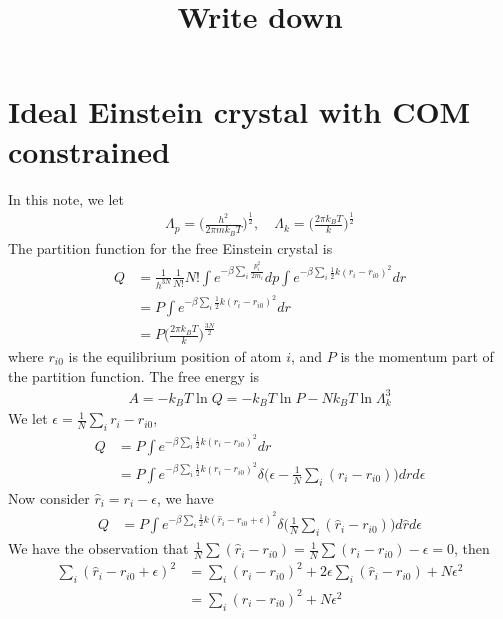 \documentclass[aps,pre,a4paper,showkeys,fleqn]{revtex4}
\begin{document}
\title{
Write down
}

\maketitle

\section{Ideal Einstein crystal with COM constrained}

In this note, we let
\begin{align*}
  \Lambda_p = \Big(\frac{h^2}{2\pi m k_BT}\Big)^{\frac12}, \quad \Lambda_k = \Big(\frac{2\pi k_BT}{k}\Big)^{\frac12}
\end{align*}
The partition function for the free Einstein crystal is
\begin{align*}
  Q & =
      \frac{1}{h^{3N}}
      \frac{1}{N!} N!
      \int e^{-\beta\sum_i\frac{p_i^2}{2m_i}} dp
      \int e^{-\beta\sum_i \frac 12k(r_i - r_{i0})^2} dr \\
    &= 
      P \int e^{-\beta\sum_i \frac 12k(r_i - r_{i0})^2} dr \\
    &=
      P \Big( \frac{2\pi k_BT}{k} \Big)^{\frac{3N}2}
\end{align*}
where $r_{i0}$ is the equilibrium position of atom $i$, and $P$ is the momentum part of the partition function.
The free energy is
\begin{align*}
  A = -k_BT\ln Q = -k_BT\ln P - Nk_BT\ln\Lambda_k^3
\end{align*}
We let $\epsilon = \frac1N \sum_i r_i - r_{i0}$,
\begin{align*}
  Q & =
      P \int e^{-\beta\sum_i \frac 12k(r_i - r_{i0})^2} dr \\
    & =
      P \int e^{-\beta\sum_i \frac 12k(r_i - r_{i0})^2} \delta\big( \epsilon - \frac1N \sum_i (r_i - r_{i0}) \big) dr d\epsilon 
\end{align*}
Now consider $\hat r_i = r_i - \epsilon$, we have
\begin{align}\label{eqn:1}
  Q & =
      P \int e^{-\beta\sum_i \frac 12k(\hat r_i - r_{i0} + \epsilon)^2} \delta\big( \frac1N \sum_i (\hat r_i - r_{i0}) \big) d\hat r d\epsilon 
\end{align}
We have the observation that $ \frac 1N \sum (\hat r_i  - r_{i0}) = \frac 1N \sum ( r_i  - r_{i0}) - \epsilon = 0$, then
\begin{align*}
  \sum_i (\hat r_i - r_{i0} + \epsilon)^2
  &=
    \sum_i (\hat r_i - r_{i0})^2 + 2\epsilon\sum_i (\hat r_i - r_{i0}) + N\epsilon^2 \\
  &=
    \sum_i (\hat r_i - r_{i0})^2 + N\epsilon^2 
\end{align*}
\end{document}
